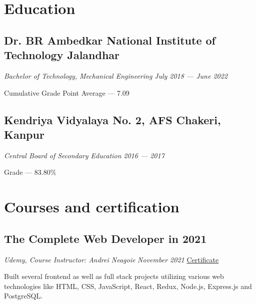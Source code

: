 \documentclass[a4paper]{article}
\begin{document}
\section{Education}
\subsection{Dr. BR Ambedkar National Institute of Technology Jalandhar}
\textit{Bachelor of Technology, Mechanical Engineering}
\hfill
\textit{July 2018 --- June 2022}

Cumulative Grade Point Average --- 7.09

\subsection{Kendriya Vidyalaya No. 2, AFS Chakeri, Kanpur}
\textit{Central Board of Secondary Education}
\hfill
\textit{2016 --- 2017}

Grade --- 83.80\%

\section{Courses and certification}
\subsection{The Complete Web Developer in 2021}
\textit{Udemy, Course Instructor: Andrei Neagoie}
\hfill
\textit{November 2021} \textbar \href{https://www.udemy.com/certificate/UC-13ddb4ce-86c8-4396-9cb7-701f5c522fd8/}{  Certificate \faExternalLink}

Built several frontend as well as full stack projects utilizing various web technologies like HTML, CSS, JavaScript, React, Redux, Node.js, Express.js and PostgreSQL.
\end{document}
